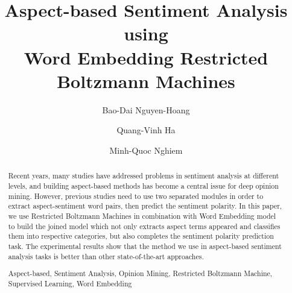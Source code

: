 \documentclass[runningheads,a4paper]{llncs}
\newcommand{\keywords}[1]{\par\addvspace\baselineskip
\noindent\keywordname\enspace\ignorespaces#1}
\begin{document}
\mainmatter

\title{Aspect-based Sentiment Analysis using \\ Word Embedding Restricted Boltzmann Machines}

\author{Bao-Dai Nguyen-Hoang
\and Quang-Vinh Ha
\and Minh-Quoc Nghiem}



%
%

\maketitle


\begin{abstract}
Recent years, many studies have addressed problems in sentiment analysis at different levels, and building aspect-based methods has become a central issue for deep opinion mining.
However, previous studies need to use two separated modules in order to extract aspect-sentiment word pairs, then predict the sentiment polarity.
In this paper, we use Restricted Boltzmann Machines in combination with Word Embedding model to build the joined model which not only extracts aspect terms appeared and classifies them into respective categories, but also completes the sentiment polarity prediction task.
The experimental results show that the method we use in aspect-based sentiment analysis tasks is better than other state-of-the-art approaches.

\keywords{Aspect-based, Sentiment Analysis, Opinion Mining, Restricted Boltzmann Machine, Supervised Learning, Word Embedding}
\end{abstract}
















\end{document}
